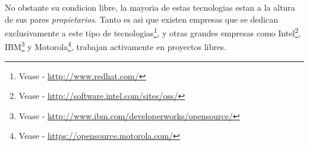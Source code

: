 No obstante su condicion libre, la mayoria de estas tecnologias estan a la
altura de sus pares \emph{propietarios}. Tanto es asi que existen empresas que
se dedican exclusivamente a este tipo de tecnologias\footnote{Vease -
\url{http://www.redhat.com/}}, y otras grandes empresas como
Intel\footnote{Vease - \url{http://software.intel.com/sites/oss/}},
IBM\footnote{Vease - \url{http://www.ibm.com/developerworks/opensource/}} y
Motorola\footnote{Vease - \url{https://opensource.motorola.com/}}, trabajan
activamente en proyectos libres.\\
